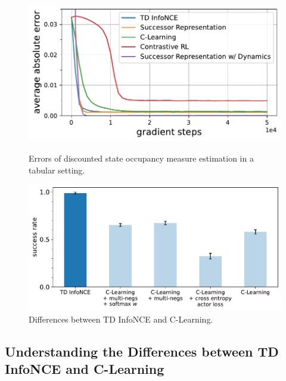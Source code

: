 \documentclass{article} %
\begin{document}
\begin{figure}[t]
    \begin{minipage}{0.48\textwidth}
        \centering
        \includegraphics[width=\linewidth]{figures/critic_analysis/p_future_est_errs_vs_gradient_steps_full.pdf}
        \vspace{-2em}
        \caption{\footnotesize Errors of discounted state occupancy measure estimation in a tabular setting.}
        \label{fig:discounted-state-occupancy-measure-est-errs-full}
    \end{minipage}
    \hfill
    \begin{minipage}{0.48\textwidth}
        \centering
        \includegraphics[width=\linewidth]{figures/ablations/td_infonce_vs_c_learning.pdf}
        \caption{Differences between TD InfoNCE and C-Learning.}
        \label{fig:td-infonce-vs-c-learning}
    \end{minipage}
\end{figure}

\subsection{Understanding the Differences between TD InfoNCE and C-Learning}
\label{appendix:td-infonce-vs-c-learning}
\end{document}
